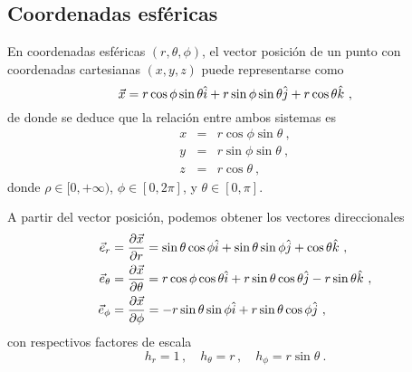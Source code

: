 \subsection{Coordenadas esféricas}

En coordenadas esféricas $(r, \theta, \phi)$, el vector posición de un punto con coordenadas cartesianas $(x,y,z)$ puede representarse como 
\begin{equation}
    \vec{x} = r \cos \phi \sin \theta \hat{i} + r \sin \phi \sin \theta \hat{j} + r \cos \theta \hat{k} \ ,
\end{equation}
de donde se deduce que la relación entre ambos sistemas es 
\begin{equation}
    \begin{array}{rcl}
        x & = & r \cos \phi \sin \theta \ , \\
        y & = & r \sin \phi \sin \theta \ , \\
        z & = & r \cos \theta \ ,
    \end{array}
\end{equation} 
donde $\rho \in [0, +\infty)$, $\phi \in [0, 2\pi]$, y $\theta \in [0, \pi]$.

A partir del vector posición, podemos obtener los vectores direccionales 
\begin{align}
    \vec{e}_r & = \frac{\partial \vec{x}}{\partial r} = \sin \theta \cos \phi \hat{i} + \sin \theta \sin \phi \hat{j} + \cos \theta \hat{k} \ , \\
    \vec{e}_\theta & = \frac{\partial \vec{x}}{\partial \theta} = r \cos \phi \cos \theta \hat{i} + r \sin \theta \cos \theta \hat{j} - r \sin \theta \hat{k} \ , \\
    \vec{e}_\phi & = \frac{\partial \vec{x}}{\partial \phi} = -r \sin \theta \sin \phi  \hat{i} + r \sin \theta \cos \phi \hat{j} \ ,
\end{align}
con respectivos factores de escala 
\begin{equation}
    h_r = 1 \, , \quad h_\theta = r \, , \quad h_\phi = r \sin \theta \ .
\end{equation}

